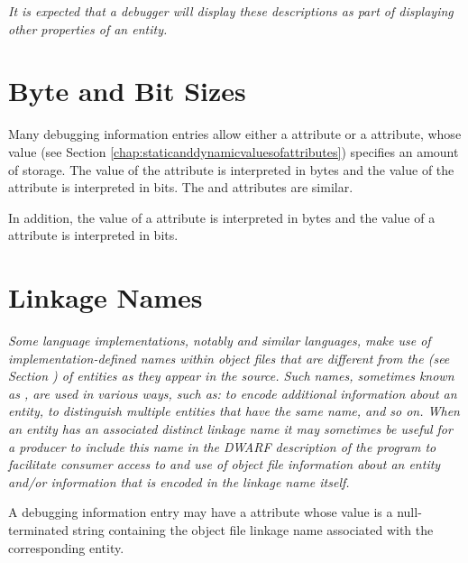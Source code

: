 \textit{It is expected that a debugger will 
display these descriptions as part of 
displaying other properties of an entity.}

\section{Byte and Bit Sizes}
\label{chap:byteandbitsizes}
Many debugging information entries allow either a
\DWATbytesizeNAME{} attribute or a 
\DWATbitsizeNAME{} attribute,
whose  value 
(see Section \ref{chap:staticanddynamicvaluesofattributes}) 
specifies an
amount of storage. The value of the 
\DWATbytesizeDEFN{} attribute
is interpreted in bytes and the value of the 
\DWATbitsizeDEFN{}
attribute is interpreted in bits. The
\DWATstringlengthbytesize{} and 
\DWATstringlengthbitsize{} 
attributes are similar.

In addition, the 
value of a \DWATbytestride{} attribute is interpreted
in bytes and the  value of a 
\DWATbitstride{}
attribute is interpreted in bits.

\section{Linkage Names}
\label{chap:linkagenames}
\textit{Some language implementations, notably 
 and similar
languages, make use of implementation-defined names within
object files that are different from the 
(see Section ) of entities as they 
appear in the source. Such names, sometimes known as 
,
are used in various ways, such as: to encode additional
information about an entity, to distinguish multiple entities
that have the same name, and so on. When an entity has an
associated distinct linkage name it may sometimes be useful
for a producer to include this name in the DWARF description
of the program to facilitate consumer access to and use of
object file information about an entity and/or information
that is encoded in the linkage name itself.  
}

A debugging information entry may have a
\DWATlinkagenameDEFN{}\hypertarget{chap:DWATlinkagenameobjectfilelinkagenameofanentity}{}
attribute
whose value is a null-terminated string containing the 
object file linkage name associated with the corresponding entity.


